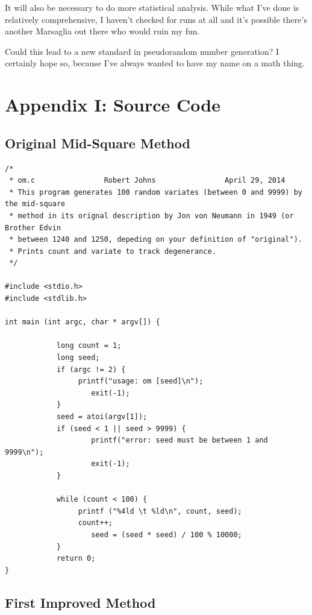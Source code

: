 \documentclass[11pt]{article}
\begin{document}
It will also be necessary to do more statistical analysis.  While what I've done is relatively comprehensive, I haven't checked for runs at all and it's possible there's another Marsaglia out there who would ruin my fun.

Could this lead to a new standard in pseudorandom number generation? I certainly hope so, because I've always wanted to have my name on a math thing.

\newpage
\section{Appendix I: Source Code}

\subsection{Original Mid-Square Method}

\begin{verbatim}/*
 * om.c                Robert Johns                April 29, 2014
 * This program generates 100 random variates (between 0 and 9999) by the mid-square
 * method in its orignal description by Jon von Neumann in 1949 (or Brother Edvin
 * between 1240 and 1250, depeding on your definition of "original"). 
 * Prints count and variate to track degenerance.
 */

#include <stdio.h>
#include <stdlib.h>

int main (int argc, char * argv[]) {
	
        	long count = 1;
        	long seed;
        	if (argc != 2) {
                 printf("usage: om [seed]\n");
                	exit(-1);
        	}
        	seed = atoi(argv[1]);
        	if (seed < 1 || seed > 9999) {
                	printf("error: seed must be between 1 and 9999\n");
                	exit(-1);
        	}
	
        	while (count < 100) {	
                 printf ("%4ld \t %ld\n", count, seed);
                 count++;
                	seed = (seed * seed) / 100 % 10000;
        	}
        	return 0;
}\end{verbatim}

\newpage
\subsection{First Improved Method}
\end{document}
